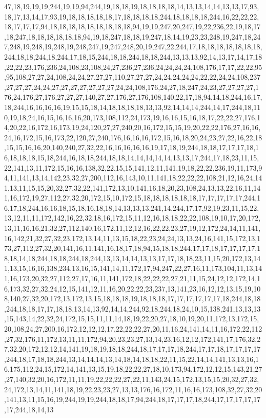 47,18,19,19,19,244,19,19,94,244,19,18,18,19,18,18,18,18,14,13,13,14,14,13,13,17,93,18,17,13,14,17,93,19,18,18,18,18,18,17,18,18,18,18,244,18,18,18,18,244,16,22,22,22,18,17,17,17,94,18,18,18,18,18,18,18,18,18,94,19,19,247,20,247,19,22,236,22,19,18,17,18,247,18,18,18,18,18,18,94,19,18,247,18,18,19,247,18,14,19,23,23,248,19,247,18,247,248,19,248,19,248,19,248,247,19,247,248,20,19,247,22,244,17,18,18,18,18,18,18,18,244,18,18,244,18,244,17,18,15,244,18,18,244,18,18,244,13,13,13,92,14,13,17,14,17,18,22,22,23,176,236,24,108,23,108,24,27,236,27,236,24,24,24,24,108,176,17,17,22,22,95,95,108,27,27,24,108,24,24,27,27,27,110,27,27,27,24,24,24,24,24,22,22,24,24,108,237,27,27,27,24,24,27,27,27,27,27,27,27,24,24,108,176,24,27,18,247,24,23,27,27,27,27,176,24,176,27,176,27,27,27,140,27,27,176,27,176,108,140,22,17,18,94,14,18,244,16,17,18,244,16,16,16,16,19,15,15,18,14,18,18,18,18,13,13,92,14,14,14,244,14,17,244,18,110,19,18,24,16,15,16,16,16,20,173,108,112,24,173,19,16,16,15,16,18,17,22,22,27,176,14,20,22,16,172,16,173,19,24,120,27,27,240,20,16,172,15,15,19,20,22,22,176,27,16,16,24,16,172,15,16,173,22,120,27,240,176,16,16,16,172,15,16,18,20,24,23,27,22,16,22,18,15,15,16,16,20,140,240,27,32,22,16,16,16,16,16,19,17,18,19,244,18,18,17,17,17,18,16,18,18,18,15,18,244,16,18,18,244,18,18,14,14,14,14,14,13,13,17,244,17,18,23,11,15,22,141,13,11,172,15,16,16,138,32,22,15,15,141,12,11,141,19,18,22,22,236,19,11,173,94,11,141,13,14,142,23,32,27,200,112,16,143,10,11,141,18,22,22,22,108,21,12,16,24,141,13,11,15,15,20,32,27,32,22,141,172,13,10,141,16,18,20,23,108,24,13,13,22,16,11,141,16,172,19,27,112,27,32,20,172,15,10,172,15,18,18,18,18,18,18,17,17,17,17,17,244,16,17,18,244,16,16,18,15,18,16,18,18,14,13,13,13,241,14,244,17,17,92,19,23,11,15,22,13,12,11,11,172,142,16,22,32,18,16,172,15,11,12,16,18,18,22,22,108,19,10,17,20,172,13,11,16,16,21,32,27,112,140,16,172,11,12,12,16,22,22,23,27,19,12,172,24,14,11,141,16,142,21,32,27,32,23,172,13,14,11,13,15,18,22,23,24,24,13,13,24,16,141,15,172,13,173,27,112,27,32,20,141,16,11,141,16,18,17,18,94,15,18,18,244,17,17,18,17,17,17,17,18,18,14,18,244,18,18,244,18,244,13,13,14,14,13,13,17,17,18,18,23,11,15,20,172,13,141,13,15,16,16,138,234,13,16,15,141,14,11,172,17,94,247,22,27,16,11,173,104,11,13,141,16,173,20,32,27,112,27,17,16,11,141,172,18,22,22,22,27,21,11,15,24,12,12,172,14,16,173,32,27,32,24,12,15,141,12,11,16,20,22,22,23,237,13,141,23,16,12,12,13,15,19,108,140,27,32,20,172,13,172,13,15,18,18,18,19,18,18,18,17,17,17,17,17,17,18,244,18,18,244,18,18,17,17,18,18,13,14,13,92,14,14,244,92,18,244,18,24,10,15,138,241,13,13,13,15,143,14,22,32,24,172,15,15,11,11,14,18,19,22,20,27,18,10,19,20,11,172,13,172,15,20,108,24,27,200,16,172,12,12,12,17,22,22,22,27,20,11,16,24,141,14,11,16,172,22,112,27,32,176,11,172,13,11,11,172,94,20,23,23,27,13,14,23,16,12,12,172,141,17,176,32,27,32,20,172,12,12,14,141,19,18,19,18,18,244,18,17,17,17,18,244,17,17,18,17,17,17,17,244,18,17,18,18,244,13,14,14,14,13,14,18,14,18,18,22,11,15,22,14,14,141,13,13,16,16,175,112,24,15,172,14,141,13,15,19,18,22,22,27,18,10,173,94,172,12,12,15,143,21,27,27,140,32,20,16,172,11,11,19,22,22,22,27,22,11,143,24,15,172,13,15,15,20,32,27,32,24,172,13,14,11,141,18,19,22,23,23,27,13,13,176,16,172,11,16,16,173,108,32,27,32,20,141,13,11,15,16,19,244,19,19,244,18,18,17,94,244,18,17,17,17,18,244,17,17,17,17,17,17,244,18,14,13